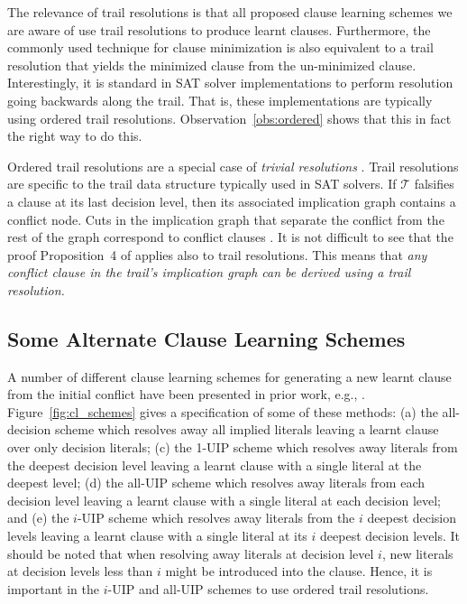 \documentclass[runningheads]{llncs}
\newcommand{\sat}{SAT\xspace}
\newcommand{\oneuip}{1-UIP\xspace}
\newcommand{\alluip}{all-UIP\xspace}
\newcommand{\trail}{\ensuremath{\mathcal{T}}}
\begin{document}
The relevance of trail resolutions is that all proposed clause
learning schemes we are aware of use trail resolutions to produce
learnt clauses. Furthermore, the commonly used technique for clause
minimization \cite{DBLP:conf/sat/SorenssonB09} is also equivalent to a
trail resolution that yields the minimized clause from the
un-minimized clause. Interestingly, it is standard in \sat solver
implementations to perform resolution going backwards along the
trail. That is, these implementations are typically using ordered
trail resolutions. Observation~\ref{obs:ordered} shows that this in
fact the right way to do this.

Ordered trail resolutions are a special case of \textit{trivial
  resolutions} \cite{DBLP:journals/jair/BeameKS04}. Trail resolutions
are specific to the trail data structure typically used in \sat
solvers. If $\trail$ falsifies a clause at its last decision level,
then its associated implication graph
\cite{DBLP:journals/tc/Marques-SilvaS99} contains a conflict
node. Cuts in the implication graph that separate the conflict from
the rest of the graph correspond to conflict clauses
\cite{DBLP:journals/jair/BeameKS04}. It is not difficult to see that
the proof Proposition~4 of \cite{DBLP:journals/jair/BeameKS04} applies
also to trail resolutions. This means that \textit{any conflict clause
  in the trail's implication graph can be derived using a trail
  resolution.}

\subsection{Some Alternate Clause Learning Schemes}
A number of different clause learning schemes for generating a new
learnt clause from the initial conflict have been presented in prior
work, e.g.,
\cite{DBLP:conf/iccad/ZhangMMM01,DBLP:conf/iccad/SilvaS96,DBLP:journals/tc/Marques-SilvaS99,DBLP:conf/aaai/BayardoS97}.
Figure~\ref{fig:cl_schemes} gives a specification of some of these
methods: (a) the all-decision scheme which resolves away all implied
literals leaving a learnt clause over only decision literals; (c) the
\oneuip scheme which resolves away literals from the deepest decision
level leaving a learnt clause with a single literal at the deepest
level; (d) the \alluip scheme which resolves away literals from each
decision level leaving a learnt clause with a single literal at each
decision level; and (e) the $i$-UIP scheme which resolves away
literals from the $i$ deepest decision levels leaving a learnt clause
with a single literal at its $i$ deepest decision levels. It should be
noted that when resolving away literals at decision level $i$, new
literals at decision levels less than $i$ might be introduced into the
clause. Hence, it is important in the $i$-UIP and \alluip schemes to
use ordered trail resolutions.
\end{document}
